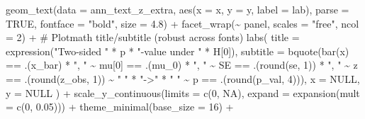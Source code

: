 \documentclass[
  letterpaper,
  DIV=11,
  numbers=noendperiod]{scrreprt}
\newenvironment{Shaded}{\begin{snugshade}}{\end{snugshade}}
\newcommand{\AttributeTok}[1]{\textcolor[rgb]{0.40,0.45,0.13}{#1}}
\newcommand{\CommentTok}[1]{\textcolor[rgb]{0.37,0.37,0.37}{#1}}
\newcommand{\ConstantTok}[1]{\textcolor[rgb]{0.56,0.35,0.01}{#1}}
\newcommand{\DecValTok}[1]{\textcolor[rgb]{0.68,0.00,0.00}{#1}}
\newcommand{\FloatTok}[1]{\textcolor[rgb]{0.68,0.00,0.00}{#1}}
\newcommand{\FunctionTok}[1]{\textcolor[rgb]{0.28,0.35,0.67}{#1}}
\newcommand{\NormalTok}[1]{\textcolor[rgb]{0.00,0.23,0.31}{#1}}
\newcommand{\SpecialCharTok}[1]{\textcolor[rgb]{0.37,0.37,0.37}{#1}}
\newcommand{\StringTok}[1]{\textcolor[rgb]{0.13,0.47,0.30}{#1}}
\begin{document}
\begin{Shaded}
\begin{Highlighting}[]
  \FunctionTok{geom\_text}\NormalTok{(}\AttributeTok{data =}\NormalTok{ ann\_text\_z\_extra,}
            \FunctionTok{aes}\NormalTok{(}\AttributeTok{x =}\NormalTok{ x, }\AttributeTok{y =}\NormalTok{ y, }\AttributeTok{label =}\NormalTok{ lab),}
            \AttributeTok{parse =} \ConstantTok{TRUE}\NormalTok{, }\AttributeTok{fontface =} \StringTok{"bold"}\NormalTok{, }\AttributeTok{size =} \FloatTok{4.8}\NormalTok{) }\SpecialCharTok{+}
  \FunctionTok{facet\_wrap}\NormalTok{(}\SpecialCharTok{\textasciitilde{}}\NormalTok{ panel, }\AttributeTok{scales =} \StringTok{"free"}\NormalTok{, }\AttributeTok{ncol =} \DecValTok{2}\NormalTok{) }\SpecialCharTok{+}
  \CommentTok{\# Plotmath title/subtitle (robust across fonts)}
  \FunctionTok{labs}\NormalTok{(}
    \AttributeTok{title =} \FunctionTok{expression}\NormalTok{(}\StringTok{"Two{-}sided "} \SpecialCharTok{*}\NormalTok{ p }\SpecialCharTok{*} \StringTok{"{-}value under "} \SpecialCharTok{*}\NormalTok{ H[}\DecValTok{0}\NormalTok{]),}
    \AttributeTok{subtitle =} \FunctionTok{bquote}\NormalTok{(}\FunctionTok{bar}\NormalTok{(x) }\SpecialCharTok{==}\NormalTok{ .(x\_bar) }\SpecialCharTok{*} \StringTok{", "} \SpecialCharTok{\textasciitilde{}}
\NormalTok{                      mu[}\DecValTok{0}\NormalTok{] }\SpecialCharTok{==}\NormalTok{ .(mu\_0) }\SpecialCharTok{*} \StringTok{", "} \SpecialCharTok{\textasciitilde{}}
\NormalTok{                      SE }\SpecialCharTok{==}\NormalTok{ .(}\FunctionTok{round}\NormalTok{(se, }\DecValTok{1}\NormalTok{)) }\SpecialCharTok{*} \StringTok{", "} \SpecialCharTok{\textasciitilde{}}
\NormalTok{                      z }\SpecialCharTok{==}\NormalTok{ .(}\FunctionTok{round}\NormalTok{(z\_obs, }\DecValTok{1}\NormalTok{)) }\SpecialCharTok{\textasciitilde{}} \StringTok{"  "} \SpecialCharTok{*} \StringTok{"{-}\textgreater{}"} \SpecialCharTok{*} \StringTok{"  "} \SpecialCharTok{\textasciitilde{}}
\NormalTok{                      p }\SpecialCharTok{==}\NormalTok{ .(}\FunctionTok{round}\NormalTok{(p\_val, }\DecValTok{4}\NormalTok{))),}
    \AttributeTok{x =} \ConstantTok{NULL}\NormalTok{, }\AttributeTok{y =} \ConstantTok{NULL}
\NormalTok{  ) }\SpecialCharTok{+}
  \FunctionTok{scale\_y\_continuous}\NormalTok{(}\AttributeTok{limits =} \FunctionTok{c}\NormalTok{(}\DecValTok{0}\NormalTok{, }\ConstantTok{NA}\NormalTok{), }\AttributeTok{expand =} \FunctionTok{expansion}\NormalTok{(}\AttributeTok{mult =} \FunctionTok{c}\NormalTok{(}\DecValTok{0}\NormalTok{, }\FloatTok{0.05}\NormalTok{))) }\SpecialCharTok{+}
  \FunctionTok{theme\_minimal}\NormalTok{(}\AttributeTok{base\_size =} \DecValTok{16}\NormalTok{) }\SpecialCharTok{+}

\end{Highlighting}
\end{Shaded}
\end{document}

